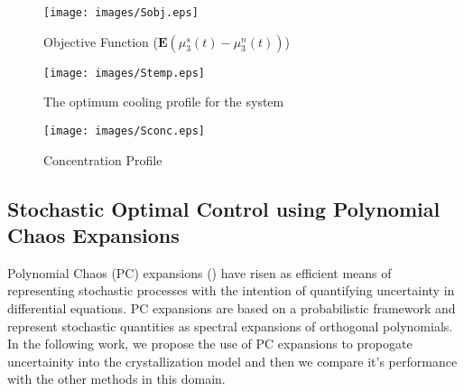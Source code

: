 \documentclass[3p,times,authoryear]{elsarticle}
\begin{document}
\begin{figure}[h!]

\begin{center}
\texttt{[image: images/Sobj.eps]}
\end{center}
\caption{Objective Function ($\mathbf{E}\left(\mu_{3}^{s}(t) - \mu_{3}^{n}(t)\right)$)} \label{Sobj}
\end{figure}
\begin{figure}[h!] 

\begin{center}
\texttt{[image: images/Stemp.eps]}
\end{center}
\caption{The optimum cooling profile for the system} \label{Stemp}
\end{figure}

\begin{figure}[h!] 

\begin{center}
\texttt{[image: images/Sconc.eps]}
\end{center}
\caption{Concentration Profile}
\end{figure}


\subsection{Stochastic Optimal Control using Polynomial Chaos Expansions}

Polynomial Chaos (PC) expansions (\cite{wiener}) have risen as efficient means of representing stochastic processes with the intention of quantifying uncertainty in differential equations. PC expansions are based on a probabilistic framework and represent stochastic quantities as spectral expansions of orthogonal polynomials. In the following work, we propose the use of PC expansions to propogate uncertainity into the crystallization model and then we compare it's performance with the other methods in this domain. 
\end{document}
